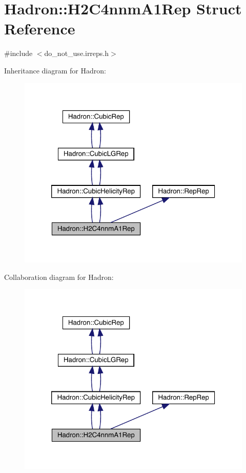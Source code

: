 \hypertarget{structHadron_1_1H2C4nnmA1Rep}{}\section{Hadron\+:\+:H2\+C4nnm\+A1\+Rep Struct Reference}
\label{structHadron_1_1H2C4nnmA1Rep}


{\ttfamily \#include $<$do\+\_\+not\+\_\+use.\+irreps.\+h$>$}



Inheritance diagram for Hadron\+:\nopagebreak
\begin{figure}[H]
\begin{center}
\leavevmode
\includegraphics[width=320pt]{dd/d05/structHadron_1_1H2C4nnmA1Rep__inherit__graph}
\end{center}
\end{figure}


Collaboration diagram for Hadron\+:\nopagebreak
\begin{figure}[H]
\begin{center}
\leavevmode
\includegraphics[width=320pt]{d6/db0/structHadron_1_1H2C4nnmA1Rep__coll__graph}
\end{center}
\end{figure}
